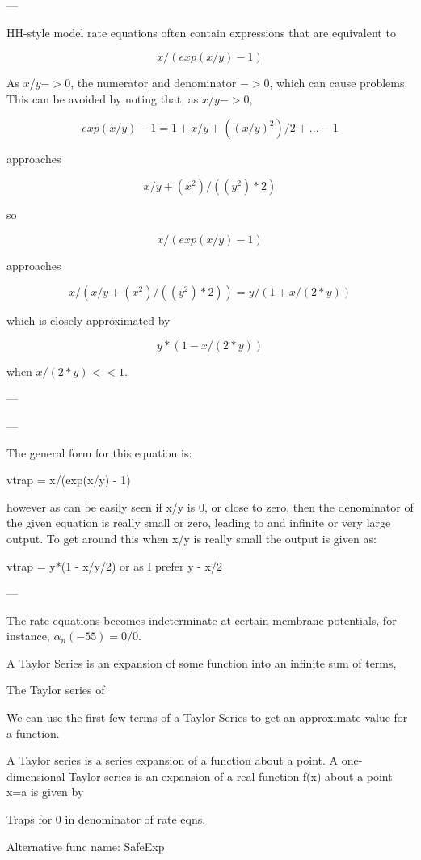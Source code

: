 ---

HH-style model rate equations often contain expressions that are equivalent to

$$x / (exp(x/y) - 1)$$

As $x/y -> 0$, the numerator and denominator $-> 0$, which can cause problems.
This can be avoided by noting that, as $x/y -> 0$,

$$exp(x/y) - 1 = 1 + x/y + ((x/y)^2)/2 + . . . - 1$$

approaches

$$x/y + (x^2)/((y^2)*2)$$

so

$$x / (exp(x/y) - 1)$$

approaches

$$x / (x/y + (x^2)/((y^2)*2)) = y / (1 + x/(2*y))$$

which is closely approximated by

$$y * (1 - x/(2*y))$$

when $x/(2*y) << 1$.

---



---

The general form for this equation is:

vtrap = x/(exp(x/y) - 1)

however as can be easily seen if x/y is 0, or close to zero, then the denominator of the given equation is really small or zero, leading to and infinite or very large output. To get around this when x/y is really small the output is given as:

vtrap = y*(1 - x/y/2) or as I prefer y - x/2

---

The rate equations becomes indeterminate at certain membrane potentials, for instance, $\alpha_n (-55) = 0 / 0$. 


A Taylor Series is an expansion of some function into an infinite sum of terms,

The Taylor series of

We can use the first few terms of a Taylor Series to get an approximate value for a function.


A Taylor series is a series expansion of a function about a point. A one-dimensional Taylor series is an expansion of a real function f(x) about a point x=a is given by


Traps for 0 in denominator of rate eqns. 

Alternative func name: SafeExp


